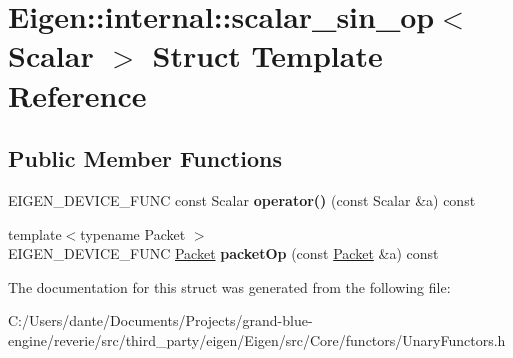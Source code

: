 \hypertarget{struct_eigen_1_1internal_1_1scalar__sin__op}{}\section{Eigen\+::internal\+::scalar\+\_\+sin\+\_\+op$<$ Scalar $>$ Struct Template Reference}
\label{struct_eigen_1_1internal_1_1scalar__sin__op}
\subsection*{Public Member Functions}
\begin{DoxyCompactItemize}
\item 
\mbox{\label{struct_eigen_1_1internal_1_1scalar__sin__op_aefe006b7c3a5a37389e4991c29bbde41}} 
E\+I\+G\+E\+N\+\_\+\+D\+E\+V\+I\+C\+E\+\_\+\+F\+U\+NC const Scalar {\bfseries operator()} (const Scalar \&a) const
\item 
\mbox{\label{struct_eigen_1_1internal_1_1scalar__sin__op_ae854606b365690e59e82e853191d28cd}} 
{\footnotesize template$<$typename Packet $>$ }\\E\+I\+G\+E\+N\+\_\+\+D\+E\+V\+I\+C\+E\+\_\+\+F\+U\+NC \mbox{\hyperlink{union_eigen_1_1internal_1_1_packet}{Packet}} {\bfseries packet\+Op} (const \mbox{\hyperlink{union_eigen_1_1internal_1_1_packet}{Packet}} \&a) const
\end{DoxyCompactItemize}


The documentation for this struct was generated from the following file\+:\begin{DoxyCompactItemize}
\item 
C\+:/\+Users/dante/\+Documents/\+Projects/grand-\/blue-\/engine/reverie/src/third\+\_\+party/eigen/\+Eigen/src/\+Core/functors/Unary\+Functors.\+h\end{DoxyCompactItemize}
